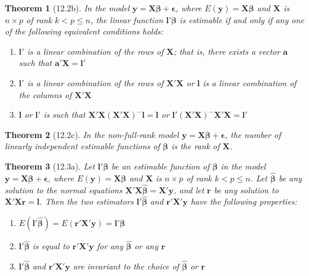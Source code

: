\documentclass{article}
\newtheorem{theorem}{Theorem}[section]
\begin{document}
\begin{theorem}[12.2b]
In the model $\mathbf{y} = \mathbf{X}\boldsymbol{\beta} + \boldsymbol{\epsilon}$, where $E(\mathbf{y}) = \mathbf{X}\boldsymbol{\beta}$ and $\mathbf{X}$ is $n \times p$ of rank $k < p \leq n$, the linear function $\mathbf{l}'\boldsymbol{\beta}$ is estimable if and only if any one of the following equivalent conditions holds:

\begin{enumerate}[label=(\roman*)]
\item $\mathbf{l}'$ is a linear combination of the rows of $\mathbf{X}$; that is, there exists a vector $\mathbf{a}$ such that $\mathbf{a}'\mathbf{X} = \mathbf{l}'$
\item $\mathbf{l}'$ is a linear combination of the rows of $\mathbf{X}'\mathbf{X}$ or $\mathbf{l}$ is a linear combination of the columns of $\mathbf{X}'\mathbf{X}$
\item $\mathbf{l}$ or $\mathbf{l}'$ is such that $\mathbf{X}'\mathbf{X}(\mathbf{X}'\mathbf{X})^{-}\mathbf{l} = \mathbf{l}$ or $\mathbf{l}'(\mathbf{X}'\mathbf{X})^{-}\mathbf{X}'\mathbf{X} = \mathbf{l}'$
\end{enumerate}
\end{theorem}

\begin{theorem}[12.2c]
In the non-full-rank model $\mathbf{y} = \mathbf{X}\boldsymbol{\beta} + \boldsymbol{\epsilon}$, the number of linearly independent estimable functions of $\boldsymbol{\beta}$ is the rank of $\mathbf{X}$.
\end{theorem}

\begin{theorem}[12.3a]
Let $\mathbf{l}'\boldsymbol{\beta}$ be an estimable function of $\boldsymbol{\beta}$ in the model $\mathbf{y} = \mathbf{X}\boldsymbol{\beta} + \boldsymbol{\epsilon}$, where $E(\mathbf{y}) = \mathbf{X}\boldsymbol{\beta}$ and $\mathbf{X}$ is $n \times p$ of rank $k < p \leq n$. Let $\hat{\boldsymbol{\beta}}$ be any solution to the normal equations $\mathbf{X}'\mathbf{X}\hat{\boldsymbol{\beta}} = \mathbf{X}'\mathbf{y}$, and let $\mathbf{r}$ be any solution to $\mathbf{X}'\mathbf{X}\mathbf{r} = \mathbf{l}$. Then the two estimators $\mathbf{l}'\hat{\boldsymbol{\beta}}$ and $\mathbf{r}'\mathbf{X}'\mathbf{y}$ have the following properties:

\begin{enumerate}[label=(\roman*)]
\item $E(\mathbf{l}'\hat{\boldsymbol{\beta}}) = E(\mathbf{r}'\mathbf{X}'\mathbf{y}) = \mathbf{l}'\boldsymbol{\beta}$
\item $\mathbf{l}'\hat{\boldsymbol{\beta}}$ is equal to $\mathbf{r}'\mathbf{X}'\mathbf{y}$ for any $\hat{\boldsymbol{\beta}}$ or any $\mathbf{r}$
\item $\mathbf{l}'\hat{\boldsymbol{\beta}}$ and $\mathbf{r}'\mathbf{X}'\mathbf{y}$ are invariant to the choice of $\hat{\boldsymbol{\beta}}$ or $\mathbf{r}$
\end{enumerate}
\end{theorem}
\end{document}
